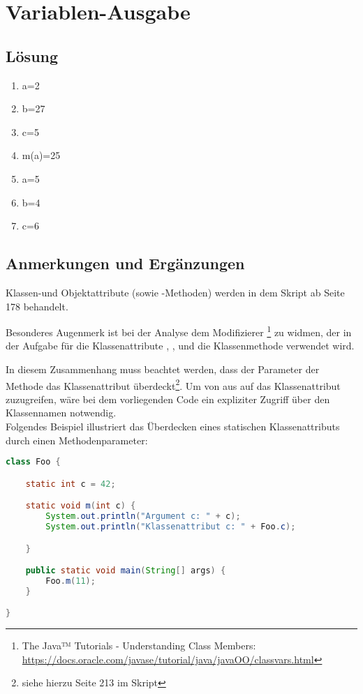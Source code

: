 \chapter{Variablen-Ausgabe}

\section*{Lösung}

\begin{enumerate}
    \item a=2
    \item b=27
    \item c=5
    \item m(a)=25
    \item a=5
    \item b=4
    \item c=6
\end{enumerate}


\section*{Anmerkungen und Ergänzungen}

Klassen-und Objektattribute (sowie -Methoden) werden in dem Skript ab Seite 178 behandelt.

Besonderes Augenmerk ist bei der Analyse dem Modifizierer \footnote{
    The Java™ Tutorials - Understanding Class Members: \url{https://docs.oracle.com/javase/tutorial/java/javaOO/classvars.html}
} zu widmen, der in der Aufgabe für
die Klassenattribute , ,  und die Klassenmethode  verwendet wird.

In diesem Zusammenhang muss beachtet werden, dass der Parameter  der Methode  das Klassenattribut 
überdeckt\footnote{
    siehe hierzu Seite 213 im Skript
}. Um von  aus auf das Klassenattribut  zuzugreifen, wäre bei dem vorliegenden Code ein expliziter Zugriff
über den Klassennamen notwendig.\\

Folgendes Beispiel illustriert das Überdecken eines statischen Klassenattributs durch einen Methodenparameter:

\begin{lstlisting}[language=java]
class Foo {

    static int c = 42;

    static void m(int c) {
        System.out.println("Argument c: " + c);
        System.out.println("Klassenattribut c: " + Foo.c);

    }

    public static void main(String[] args) {
        Foo.m(11);
    }

}
\end{lstlisting}

